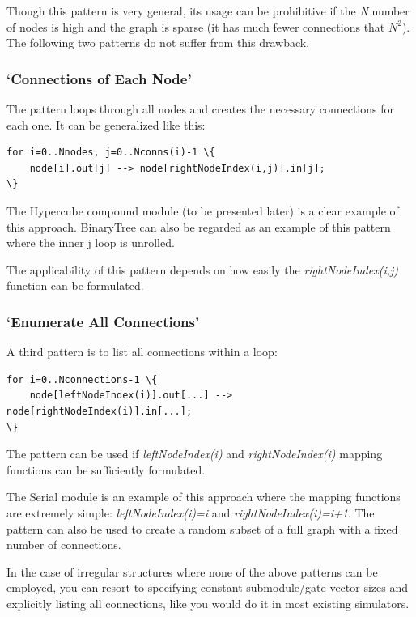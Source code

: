 Though this pattern is very general, its usage can be prohibitive if
the \textit{N} number of nodes is high and the graph is sparse (it has
much fewer connections that $N^2$). The following
two patterns do not suffer from this drawback.


\subsubsection{`Connections of Each Node'}

The pattern loops through all nodes and creates the necessary
connections for each one. It can be generalized like this:

\begin{Verbatim}[commandchars=\\\{\}]
for i=0..Nnodes, j=0..Nconns(i)-1 \{
    node[i].out[j] --> node[rightNodeIndex(i,j)].in[j];
\}
\end{Verbatim}

The Hypercube compound module (to be
presented later) is a clear example of this approach. BinaryTree can
also be regarded as an example of this pattern where the inner j loop
is unrolled.

The applicability of this pattern depends on how easily the \textit{rightNodeIndex(i,j)}
function can be formulated.


\subsubsection{`Enumerate All Connections'}


A third pattern is to list all connections within a loop:

\begin{Verbatim}[commandchars=\\\{\}]
for i=0..Nconnections-1 \{
    node[leftNodeIndex(i)].out[...] --> node[rightNodeIndex(i)].in[...];
\}
\end{Verbatim}

The pattern can be used if \textit{leftNodeIndex(i)} and \textit{rightNodeIndex(i)}
mapping functions can be sufficiently formulated.

The Serial module is an example of this approach where the mapping
functions are extremely simple: \textit{leftNodeIndex(i)=i} and \textit{rightNodeIndex(i)=i+1}.
The pattern can also be used to create a random subset of a full
graph with a fixed number of connections.

In the case of irregular structures where none of the above patterns
can be employed, you can resort to specifying constant submodule/gate
vector sizes and explicitly listing all connections, like you
would do it in most existing simulators.





